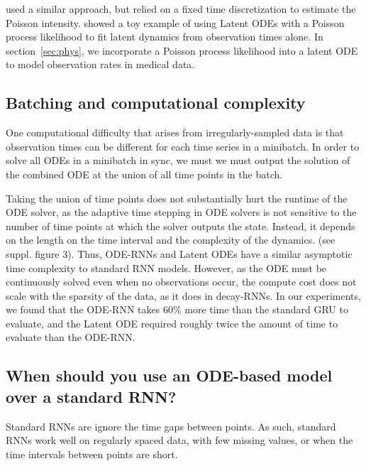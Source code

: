 \documentclass{article}
\begin{document}
\citet{neural_hawkes} used a similar approach, but relied on a fixed time discretization to estimate the Poisson intensity. 
\citet{NeuralODE} showed a toy example of using Latent ODEs with a Poisson process likelihood to fit latent dynamics from observation times alone.
In section~\ref{sec:phys}, we incorporate a Poisson process likelihood into a latent ODE to model observation rates in medical data.




\subsection{Batching and computational complexity}
One computational difficulty that arises from irregularly-sampled data is that observation times can be different for each time series in a minibatch.
In order to solve all ODEs in a minibatch in sync, we must we must output the solution of the combined ODE at the union of all time points in the batch.


Taking the union of time points does not substantially hurt the runtime of the ODE solver, as the adaptive time stepping in ODE solvers is not sensitive to the number of time points  at which the solver outputs the state.
Instead, it depends on the length on the time interval  and the complexity of the dynamics. (see suppl. figure 3).
Thus, ODE-RNNs and Latent ODEs have a similar asymptotic time complexity to standard RNN models. However, as the ODE must be continuously solved even when no observations occur, the compute cost does not scale with the sparsity of the data, as it does in decay-RNNs.
In our experiments, we found that the ODE-RNN takes 60\% more time than the standard GRU to evaluate, and the Latent ODE required roughly twice the amount of time to evaluate than the ODE-RNN.












\subsection{When should you use an ODE-based model over a standard RNN?}



Standard RNNs are ignore the time gaps between points.
As such, standard RNNs work well on regularly spaced data, with few missing values, or when the time intervals between points are short.
\end{document}
